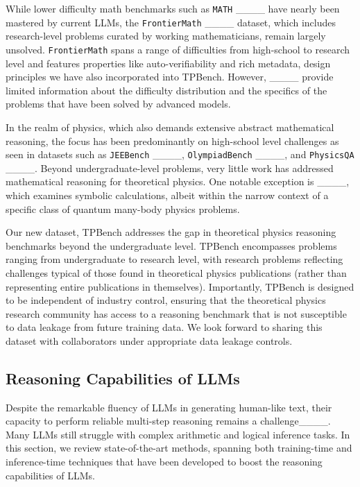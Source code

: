While lower difficulty math benchmarks such as \texttt{MATH} ____ have nearly been mastered by current LLMs, the \texttt{FrontierMath} ____ dataset, which includes research-level problems curated by working mathematicians, remain largely unsolved. \texttt{FrontierMath} spans a range of difficulties from high-school to research level and features properties like auto-verifiability and rich metadata, design principles we have also incorporated into TPBench. However, ____ provide limited information about the difficulty distribution and the specifics of the problems that have been solved by advanced models.

In the realm of physics, which also demands extensive abstract mathematical reasoning, the focus has been predominantly on high-school level challenges as seen in datasets such as \texttt{JEEBench} ____, \texttt{OlympiadBench} ____, and \texttt{PhysicsQA} ____. Beyond undergraduate-level problems, very little work has addressed mathematical reasoning for theoretical physics. One notable exception is ____, which examines symbolic calculations, albeit within the narrow context of a specific class of quantum many-body physics problems.

Our new dataset, TPBench addresses the gap in theoretical physics reasoning benchmarks beyond the undergraduate level. TPBench encompasses problems ranging from undergraduate to research level, with research problems reflecting challenges typical of those found in theoretical physics publications (rather than representing entire publications in themselves). 
Importantly, TPBench is designed to be independent of industry control, ensuring that the theoretical physics research community has access to a reasoning benchmark that is not susceptible to data leakage from future training data. We look forward to sharing this dataset with collaborators under appropriate data leakage controls.

\subsection{Reasoning Capabilities of LLMs}
\label{sec:related_methods}
Despite the remarkable fluency of LLMs in generating human-like text, their capacity to perform reliable multi-step reasoning remains a challenge____. Many LLMs still struggle with complex arithmetic and logical inference tasks. In this section, we review state-of-the-art methods, spanning both training-time and inference-time techniques that have been developed to boost the reasoning capabilities of LLMs.

